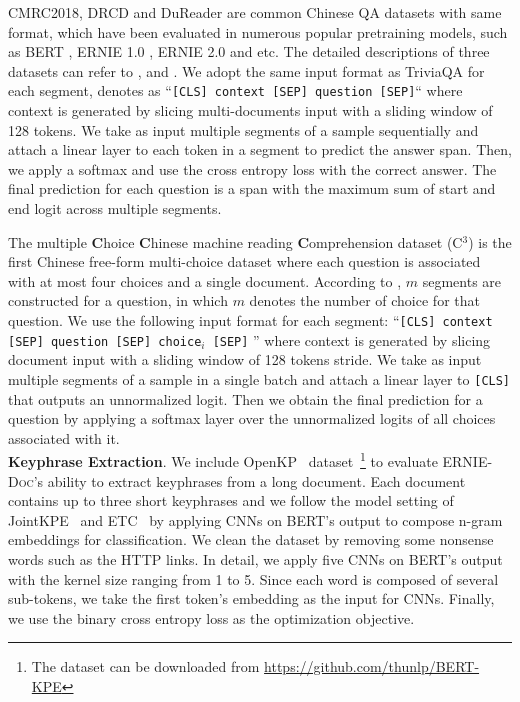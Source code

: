 \documentclass[11pt,a4paper]{article}
\newcommand{\mname}{\textsc{ERNIE-Doc}\xspace}
\begin{document}
CMRC2018, DRCD and DuReader are common Chinese QA datasets with same format, which have been evaluated in numerous popular pretraining models, such as BERT \citep{devlin2018bert}, ERNIE 1.0 \citep{sun2019ernie}, ERNIE 2.0 \citep{sun2020ernie} and etc. The detailed descriptions of three datasets can refer to \citet{cmrc2018}, \citet{drcd} and \citet{dureader}. We adopt the same input format as TriviaQA for each segment, denotes as ``\texttt{[CLS] context [SEP] question [SEP]}`` where context is generated by slicing multi-documents input with a sliding window of 128 tokens. We take as input multiple segments of a sample sequentially and attach a linear layer to each token in a segment to predict the answer span. Then, we apply a softmax and use the cross entropy loss with the correct answer. The final prediction for each question is a span with the maximum sum of start and end logit across multiple segments. 

The multiple \textbf{C}hoice \textbf{C}hinese machine reading \textbf{C}omprehension dataset (C$^3$) \citep{c3} is the first Chinese free-form multi-choice dataset where each question is associated with at most four choices and a single document. According to \citep{c3}, $m$ segments are constructed for a question, in which $m$ denotes the number of choice for that question. We use the following input format for each segment:  ``\texttt{[CLS] context [SEP] question [SEP] choice$_i$ [SEP]} '' where context is generated by slicing document input with a sliding window of 128 tokens stride. We take as input multiple segments of a sample in a single batch and attach a linear layer to \texttt{[CLS]} that outputs an unnormalized logit. Then we obtain the final prediction for a question by applying a softmax layer over the unnormalized logits of all choices associated with it. 
\\

\noindent \textbf{Keyphrase Extraction}. We include OpenKP~\citep{xiong2019open} dataset~\footnote{The dataset can be downloaded from \url{https://github.com/thunlp/BERT-KPE}} to evaluate \mname's ability to extract keyphrases from a long document. Each document contains up to three short keyphrases and we follow the model setting of JointKPE~\citep{sun2020joint} and ETC~\citep{ainslie2020etc} by applying CNNs on BERT's output to compose n-gram embeddings for classification. We clean the dataset by removing some nonsense words such as the HTTP links. In detail, we apply five CNNs on BERT's output with the kernel size ranging from 1 to 5. Since each word is composed of several sub-tokens, we take the first token's embedding as the input for CNNs. Finally, we use the binary cross entropy loss as the optimization objective.
\end{document}
